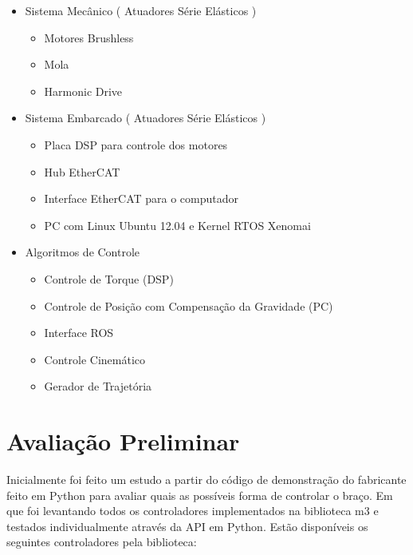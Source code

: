 \begin{itemize}
    \item Sistema Mecânico ( Atuadores Série Elásticos )
    \begin{itemize}
        \item Motores Brushless
        \item Mola
        \item Harmonic Drive
    \end{itemize}
    \item Sistema Embarcado ( Atuadores Série Elásticos )
    \begin{itemize}
        \item Placa DSP para controle dos motores
        \item Hub EtherCAT
        \item Interface EtherCAT para o computador
        \item PC com Linux Ubuntu 12.04 e Kernel RTOS Xenomai
    \end{itemize}
    \item Algoritmos de Controle
    \begin{itemize}
        \item Controle de Torque (DSP)
        \item Controle de Posição com Compensação da Gravidade (PC)
        \item Interface ROS
        \item Controle Cinemático
        \item Gerador de Trajetória
    \end{itemize}
\end{itemize}




\section{Avaliação Preliminar}

Inicialmente foi feito um estudo a partir do código de demonstração do fabricante feito em Python para avaliar quais as possíveis forma de controlar o braço. Em que foi levantando todos os controladores implementados na biblioteca m3 e testados individualmente através da API em Python. Estão disponíveis os seguintes controladores pela biblioteca:

